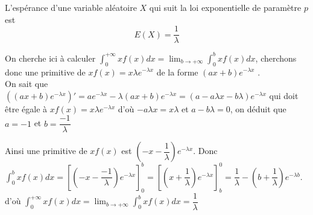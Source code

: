 \documentclass[french]{book}
\newcommand{\ds}{\displaystyle}
\newcommand{\cro}[1]{ \ds [#1]}
\newcommand{\dx}{dx}
\begin{document}
\begin{prop}
 L'espérance d'une variable aléatoire $X$ qui suit la loi exponentielle de paramètre $p$ est $$E(X)=\frac{1}{\lambda}$$
\end{prop}

\begin{demo}
On cherche ici à calculer $\int_{0}^{+ \infty}xf(x)\dx =  \lim_{b\rightarrow +\infty}\int_{0}^{b}xf(x)\dx$, cherchons donc une primitive de $xf(x)=x\lambda e^{-\lambda x}$ de la forme $(ax+b)e^{-\lambda x}$ .\\

On sait que $((ax+b)e^{-\lambda x})'=ae^{-\lambda x}-\lambda(ax+b)e^{-\lambda x}=(a-a\lambda x-b\lambda)e^{-\lambda x}$ qui doit être égale à $xf(x)=x\lambda e^{-\lambda x}$ d'où $-a\lambda x=x\lambda$ et $a-b\lambda=0$, on déduit que $a=-1$ et $b=\dfrac{-1}{\lambda}$

Ainsi une primitive de $xf(x)$ est $(-x-\dfrac{1}{\lambda})e^{-\lambda x}$. Donc $\int_{0}^{b}xf(x)\dx=\cro{(-x-\dfrac{-1}{\lambda})e^{-\lambda x}}_0^b=\cro{(x+\dfrac{1}{\lambda})e^{-\lambda x}}_b^0=\dfrac{1}{\lambda}-(b+\dfrac{1}{\lambda})e^{-\lambda b}$. \\

d'où $\int_{0}^{+ \infty}xf(x)\dx =  \lim_{b\rightarrow +\infty}\int_{0}^{b}xf(x)\dx=\dfrac{1}{\lambda}$
 

\end{demo}
\end{document}
